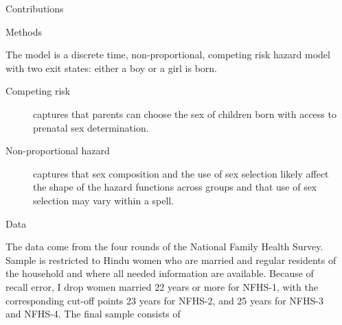 \documentclass[final]{beamer}
\newlength{\onecolwid}
\newlength{\twocolwid}
\begin{document}
\begin{frame}{}
\begin{columns}[t]
\begin{column}{\onecolwid}
\begin{alertblock}{Contributions}
\end{alertblock}


\begin{block}{Methods}


The model is a discrete time, non-proportional, competing risk 
hazard model with two  exit states: either a boy or a girl is born.
\begin{description}
\item[Competing risk] captures that
parents can choose the sex of children born with access to prenatal 
sex determination.
\item[Non-proportional hazard] captures that sex composition and 
the use of sex selection likely affect the shape of the hazard 
functions across groups and that use of sex selection may vary
within a spell.
\end{description}

\end{block}

\begin{block}{Data}

The data come from the four rounds of the National Family Health Survey.
Sample is restricted to Hindu women who are married and regular residents of
the household and where all needed information are available.
Because of recall error, I drop women married 22 years or more 
for NFHS-1, with the corresponding cut-off points 23 years for NFHS-2, 
and 25 years for NFHS-3 and NFHS-4.
The final sample consists of 


\end{block}



\end{column}



\begin{column}{\twocolwid}


\end{column}
\end{columns}
\end{frame}
\end{document}
